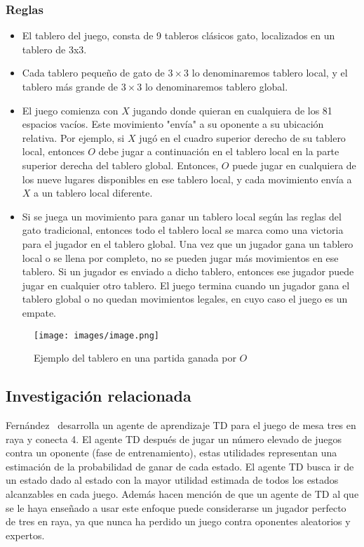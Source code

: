\documentclass[runningheads]{llncs}
\begin{document}
\subsubsection{Reglas}
\begin{itemize}
    \item El tablero del juego, consta de 9 tableros clásicos gato, localizados en un tablero de 3x3.
    \item Cada tablero pequeño de gato de $3 \times 3$ lo denominaremos tablero local, y el tablero más grande de $3 \times 3$ lo denominaremos tablero global.
    \item El juego comienza con $X$ jugando donde quieran en cualquiera de los 81 espacios vacíos. Este movimiento "envía" a su oponente a su ubicación relativa. Por ejemplo, si $X$ jugó en el cuadro superior derecho de su tablero local, entonces $O$ debe jugar a continuación en el tablero local en la parte superior derecha del tablero global. Entonces, $O$ puede jugar en cualquiera de los nueve lugares disponibles en ese tablero local, y cada movimiento envía a $X$ a un tablero local diferente.
    
    \item Si se juega un movimiento para ganar un tablero local según las reglas del gato tradicional, entonces todo el tablero local se marca como una victoria para el jugador en el tablero global. Una vez que un jugador gana un tablero local o se llena por completo, no se pueden jugar más movimientos en ese tablero. Si un jugador es enviado a dicho tablero, entonces ese jugador puede jugar en cualquier otro tablero. El juego termina cuando un jugador gana el tablero global o no quedan movimientos legales, en cuyo caso el juego es un empate.

\end{itemize}
\begin{figure}[h]
\centering
\texttt{[image: images/image.png]}
\caption{Ejemplo del tablero en una partida ganada por $O$}
\end{figure}
\subsection{Investigación relacionada}
Fernández~\cite{ref_article0} desarrolla un agente de aprendizaje TD para el juego de mesa tres en raya y conecta 4. El agente TD después de jugar un número elevado de juegos contra un oponente (fase de entrenamiento), estas utilidades representan una estimación de la probabilidad de ganar de cada estado. El agente TD busca ir de un estado dado al estado con la mayor utilidad estimada de todos los estados alcanzables en cada juego. Además hacen mención de que un agente de TD al que se le haya enseñado a usar este enfoque puede considerarse un jugador perfecto de tres en raya, ya que nunca ha perdido un juego contra oponentes aleatorios y expertos.
\end{document}
